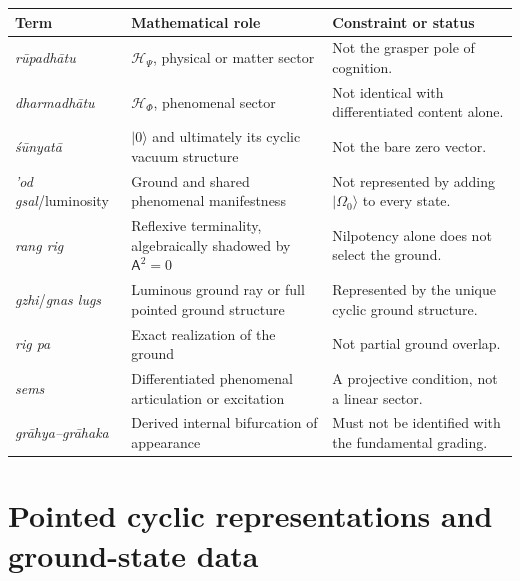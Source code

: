 \documentclass[11pt,reqno]{scrartcl}
\newcommand{\scrHP}{\mathscr H_{\Psi}}
\newcommand{\scrHF}{\mathscr H_{\Phi}}
\newcommand{\Aodd}{\mathsf A}
\newcommand{\ket}[1]{\lvert #1\rangle}
\theoremstyle{plain}
\theoremstyle{definition}
\theoremstyle{remark}
\begin{document}
\begin{center}
\small
\begin{tabularx}{\textwidth}{>{\raggedright\arraybackslash}p{}
>{\raggedright\arraybackslash}p{}
>{\raggedright\arraybackslash}X}
\toprule
\textbf{Term} & \textbf{Mathematical role} & \textbf{Constraint or status} \\
\midrule
\emph{r\=upadh\=atu} & \(\scrHP\), physical or matter sector & Not the grasper pole of cognition. \\
\emph{dharmadh\=atu} & \(\scrHF\), phenomenal sector & Not identical with differentiated content alone. \\
\emph{\'s\=unyat\=a} & \(\ket0\) and ultimately its cyclic vacuum structure & Not the bare zero vector. \\
\emph{'od gsal}/luminosity & Ground and shared phenomenal manifestness & Not represented by adding \(\ket{\Omega_0}\) to every state. \\
\emph{rang rig} & Reflexive terminality, algebraically shadowed by \(\Aodd^2=0\) & Nilpotency alone does not select the ground. \\
\emph{gzhi}/\emph{gnas lugs} & Luminous ground ray or full pointed ground structure & Represented by the unique cyclic ground structure. \\
\emph{rig pa} & Exact realization of the ground & Not partial ground overlap. \\
\emph{sems} & Differentiated phenomenal articulation or excitation & A projective condition, not a linear sector. \\
\emph{gr\=ahya--gr\=ahaka} & Derived internal bifurcation of appearance & Must not be identified with the fundamental grading. \\
\bottomrule
\end{tabularx}
\end{center}
\section{Pointed cyclic representations and ground-state data}
\label{sec:pointed-ground-representations}
\end{document}
